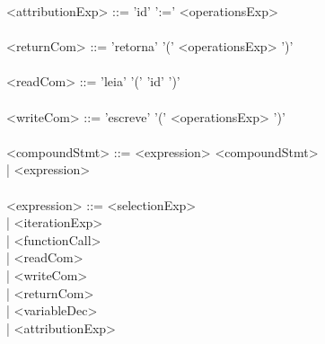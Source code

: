 \documentclass[12pt,a4paper,final]{report}
\newcommand\tab[1][1cm]{\hspace*{#1}}
\begin{document}
<attributionExp> ::= 'id' ':=' <operationsExp>\\
\\
<returnCom> ::= 'retorna' '(' <operationsExp> ')'\\
\\
<readCom> ::= 'leia' '(' 'id' ')'\\
\\
<writeCom> ::= 'escreve' '(' <operationsExp> ')'\\
\\
<compoundStmt> ::= <expression> <compoundStmt>\\
\tab \tab \tab \tab | <expression>\\
\\
<expression> ::= <selectionExp>\\
\tab \tab \tab | <iterationExp>\\
\tab \tab \tab | <functionCall>\\
\tab \tab \tab | <readCom>\\
\tab \tab \tab | <writeCom>\\
\tab \tab \tab | <returnCom>\\
\tab \tab \tab | <variableDec>\\
\tab \tab \tab | <attributionExp>\\
\\
\end{document}
